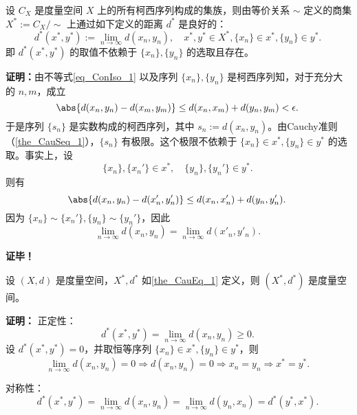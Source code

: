 \begin{theorem}{}\label{the_CauEq_1}
设 $C_X$ 是度量空间 $X$ 上的所有柯西序列构成的集族，则由等价关系 $\sim$ 定义的商集 $X^*:=C_X/\sim$ 上通过如下定义的距离 $d^*$ 是良好的：
\begin{equation}
d^*(x^*,y^*):=\lim_{n\rightarrow\infty} d(x_n,y_n),\quad x^*,y^*\in X^*,\{x_n\}\in x^*,\{y_n\}\in y^*.~
\end{equation}
即 $d^*(x^*,y^*)$ 的取值不依赖于 $\{x_n\},\{y_n\}$ 的选取且存在。
\end{theorem}
\textbf{证明：}由不等式\autoref{eq_ConIso_1} 以及序列 $\{x_n\},\{y_n\}$ 是柯西序列知，对于充分大的 $n,m$，成立
\begin{equation}
\abs{d(x_n,y_n)-d(x_m,y_m)}\leq d(x_n,x_m)+d(y_n,y_m)<\epsilon.~
\end{equation}
于是序列 $\{s_n\}$ 是实数构成的柯西序列，其中 $s_n:=d(x_n,y_n)$。由Cauchy准则（\autoref{the_CauSeq_1}），$\{s_n\}$ 有极限。这个极限不依赖于 $\{x_n\}\in x^*,\{y_n\}\in y^*$ 的选取。事实上，设
\begin{equation}
\{x_n\},\{x_n'\}\in x^*,\quad \{y_n\},\{y_n'\}\in y^*.~
\end{equation}
则有
\begin{equation}
\abs{d(x_n,y_n)-d(x'_n,y'_n)}\leq d(x_n,x_n')+d(y_n,y'_n).~
\end{equation}
因为 $\{x_n\}\sim\{x_n'\},\{y_n\}\sim\{y_n'\}$，因此
\begin{equation}
\lim_{n\rightarrow\infty}d(x_n,y_n)=\lim_{n\rightarrow\infty}d(x'_n,y'_n).~
\end{equation}

\textbf{证毕！}

\begin{theorem}{}\label{the_CauEq_2}
设 $(X,d)$ 是度量空间，$X^*,d^*$ 如\autoref{the_CauEq_1} 定义，则 $(X^*,d^*)$ 是度量空间。
\end{theorem}

\textbf{证明：}
正定性：
\begin{equation}
d^*(x^*,y^*)=\lim_{n\rightarrow\infty} d(x_n,y_n)\geq0.~
\end{equation}
设 $d^*(x^*,y^*)=0$，并取恒等序列 $\{x_n\}\in x^*,\{y_n\}\in y^*$，则
\begin{equation}
\lim_{n\rightarrow\infty} d(x_n,y_n)=0\Rightarrow d(x_n,y_n)=0\Rightarrow x_n=y_n\Rightarrow x^*=y^*.~
\end{equation}


对称性：
\begin{equation}
d^*(x^*,y^*)=\lim_{n\rightarrow\infty} d(x_n,y_n)=\lim_{n\rightarrow\infty} d(y_n,x_n)=d^*(y^*,x^*).~
\end{equation}

